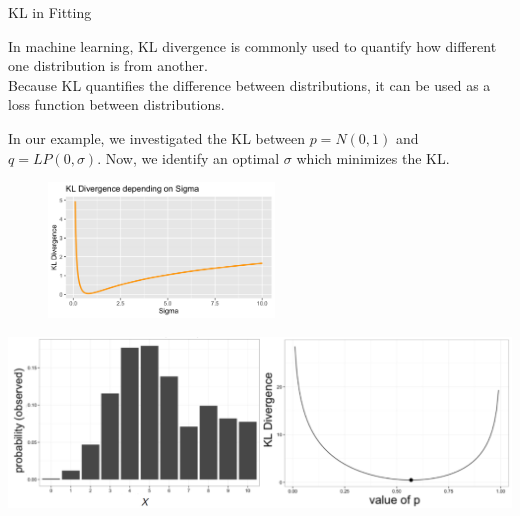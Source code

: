 \documentclass[11pt,compress,t,notes=noshow, xcolor=table]{beamer}
\begin{document}
\begin{vbframe} {KL in Fitting}

In machine learning, KL divergence is commonly used to quantify how different one distribution is from another.\\

Because KL quantifies the difference between distributions, it can be used as a loss function between distributions. %
\lz

In our example, we investigated the KL between $p=N(0, 1)$ and $q=LP(0, \sigma).$ Now, we identify an optimal $\sigma$ which minimizes the KL.

\begin{figure}
\includegraphics[width = 6cm ]{figure/kl_norm_lp_sigma.png} 
\end{figure}


{\includegraphics{figure_man/binom1.png}}



\end{vbframe}
\end{document}
